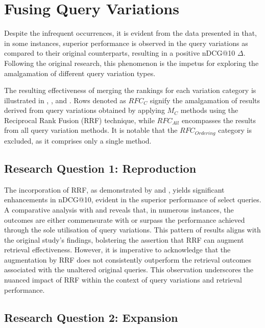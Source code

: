 \section{Fusing Query Variations}
Despite the infrequent occurrences, it is evident from the data presented in  that, in some instances, superior performance is observed in the query variations as compared to their original counterparts, resulting in a positive nDCG@10 $\Delta$. Following the original research, this phenomenon is the impetus for exploring the amalgamation of different query variation types.

The resulting effectiveness of merging the rankings for each variation category is illustrated in , , and . Rows denoted as $ RFC_C $ signify the amalgamation of results derived from query variations obtained by applying $ M_C $ methods using the Reciprocal Rank Fusion (RRF) technique, while $ RFC_{All} $ encompasses the results from all query variation methods. It is notable that the $ RFC_{Ordering} $ category is excluded, as it comprises only a single method.

\subsection{Research Question 1: Reproduction}


The incorporation of RRF, as demonstrated by  and , yields significant enhancements in nDCG@10, evident in the superior performance of select queries. A comparative analysis with  and  reveals that, in numerous instances, the outcomes are either commensurate with or surpass the performance achieved through the sole utilisation of query variations. This pattern of results aligns with the original study's findings, bolstering the assertion that RRF can augment retrieval effectiveness. However, it is imperative to acknowledge that the augmentation by RRF does not consistently outperform the retrieval outcomes associated with the unaltered original queries. This observation underscores the nuanced impact of RRF within the context of query variations and retrieval performance.

\subsection{Research Question 2: Expansion}


